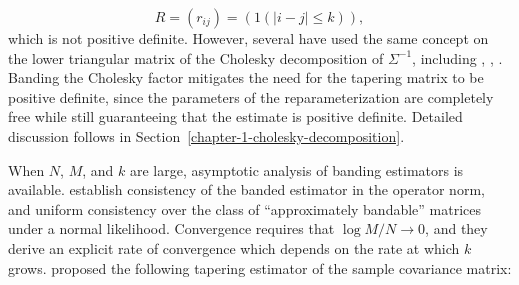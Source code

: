 \[
R = \left(r_{ij}\right) = \left( 1\left(\vert i-j \vert \le k\right)\right),
\] 
\noindent
which is not positive definite. However, several have used the same concept on the lower triangular matrix of the Cholesky decomposition of $\Sigma^{-1}$, including \cite{wu2003nonparametric}, \cite{huang2006covariance}, \cite{levina2008sparse}. Banding the Cholesky factor mitigates the need for the tapering matrix to be positive definite, since the parameters of the reparameterization are completely free while still guaranteeing that the estimate is positive definite. Detailed discussion follows in Section~\ref{chapter-1-cholesky-decomposition}. 

\bigskip

When $N$, $M$, and $k$ are large, asymptotic analysis of banding estimators is available. \cite{bickel2008regularized} establish consistency of the banded estimator in the operator norm, and uniform consistency over the class of ``approximately bandable'' matrices under a normal likelihood. Convergence requires that $\log M/ N \rightarrow 0$, and they derive an explicit rate of convergence which depends on the rate at which $k$ grows. \cite{cai2010optimal} proposed the following tapering estimator of the sample covariance matrix:

